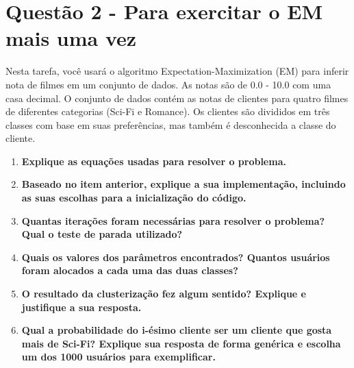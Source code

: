 \section*{Questão 2 - Para exercitar o EM mais uma vez}

Nesta tarefa, você usará o algoritmo Expectation-Maximization (EM) para inferir nota de filmes em um conjunto de dados. As notas são de 0.0 - 10.0 com uma casa decimal. O conjunto de dados contém as notas de clientes para quatro filmes de diferentes categorias (Sci-Fi e Romance). Os clientes são divididos em três classes com base em suas preferências, mas também é desconhecida a classe do cliente.

\begin{enumerate}
    \item \textbf{Explique as equações usadas para resolver o problema.}
    \item \textbf{Baseado no item anterior, explique a sua implementação, incluindo as suas escolhas para a inicialização do código.}
    \item \textbf{Quantas iterações foram necessárias para resolver o problema? Qual o teste de parada utilizado?}
    \item \textbf{Quais os valores dos parâmetros encontrados? Quantos usuários foram alocados a cada uma das duas classes?}
    \item \textbf{O resultado da clusterização fez algum sentido? Explique e justifique a sua resposta.}
    \item \textbf{Qual a probabilidade do i-ésimo cliente ser um cliente que gosta mais de Sci-Fi? Explique sua resposta de forma genérica e escolha um dos 1000 usuários para exemplificar.}
\end{enumerate}


